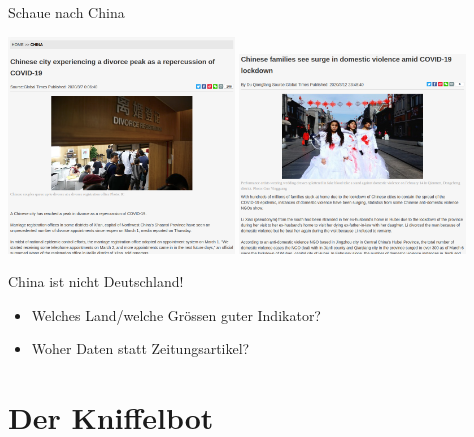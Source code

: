 \documentclass{beamer}
\begin{document}
\begin{frame}{Schaue nach China}

\begin{center}
    \includegraphics[width=0.45\textwidth]{fig_divorce_china}
    \includegraphics[width=0.45\textwidth]{fig_dom_violence_china}
\end{center}

\begin{alertblock}{China ist nicht Deutschland!}
\begin{itemize}
 \item Welches Land/welche Gr\"ossen guter Indikator?
 \item Woher Daten statt Zeitungsartikel?
\end{itemize}
\end{alertblock}

\end{frame}


\section{Der Kniffelbot}
\end{document}
